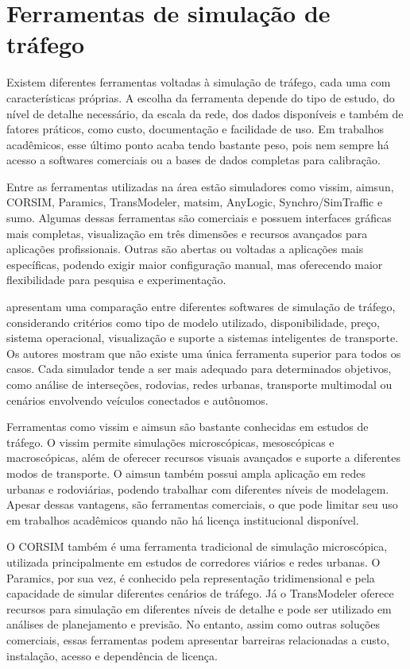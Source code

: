 \section{Ferramentas de simulação de tráfego}

Existem diferentes ferramentas voltadas à simulação de tráfego, cada uma com características próprias. A escolha da ferramenta depende do tipo de estudo, do nível de detalhe necessário, da escala da rede, dos dados disponíveis e também de fatores práticos, como custo, documentação e facilidade de uso. Em trabalhos acadêmicos, esse último ponto acaba tendo bastante peso, pois nem sempre há acesso a softwares comerciais ou a bases de dados completas para calibração.

Entre as ferramentas utilizadas na área estão simuladores como \gls{vissim}, \gls{aimsun}, CORSIM, Paramics, TransModeler, \gls{matsim}, AnyLogic, Synchro/SimTraffic e \gls{sumo}. Algumas dessas ferramentas são comerciais e possuem interfaces gráficas mais completas, visualização em três dimensões e recursos avançados para aplicações profissionais. Outras são abertas ou voltadas a aplicações mais específicas, podendo exigir maior configuração manual, mas oferecendo maior flexibilidade para pesquisa e experimentação.

 apresentam uma comparação entre diferentes softwares de simulação de tráfego, considerando critérios como tipo de modelo utilizado, disponibilidade, preço, sistema operacional, visualização e suporte a sistemas inteligentes de transporte. Os autores mostram que não existe uma única ferramenta superior para todos os casos. Cada simulador tende a ser mais adequado para determinados objetivos, como análise de interseções, rodovias, redes urbanas, transporte multimodal ou cenários envolvendo veículos conectados e autônomos.

Ferramentas como \gls{vissim} e \gls{aimsun} são bastante conhecidas em estudos de tráfego. O \gls{vissim} permite simulações microscópicas, mesoscópicas e macroscópicas, além de oferecer recursos visuais avançados e suporte a diferentes modos de transporte. O \gls{aimsun} também possui ampla aplicação em redes urbanas e rodoviárias, podendo trabalhar com diferentes níveis de modelagem. Apesar dessas vantagens, são ferramentas comerciais, o que pode limitar seu uso em trabalhos acadêmicos quando não há licença institucional disponível.

O CORSIM também é uma ferramenta tradicional de simulação microscópica, utilizada principalmente em estudos de corredores viários e redes urbanas. O Paramics, por sua vez, é conhecido pela representação tridimensional e pela capacidade de simular diferentes cenários de tráfego. Já o TransModeler oferece recursos para simulação em diferentes níveis de detalhe e pode ser utilizado em análises de planejamento e previsão. No entanto, assim como outras soluções comerciais, essas ferramentas podem apresentar barreiras relacionadas a custo, instalação, acesso e dependência de licença.

